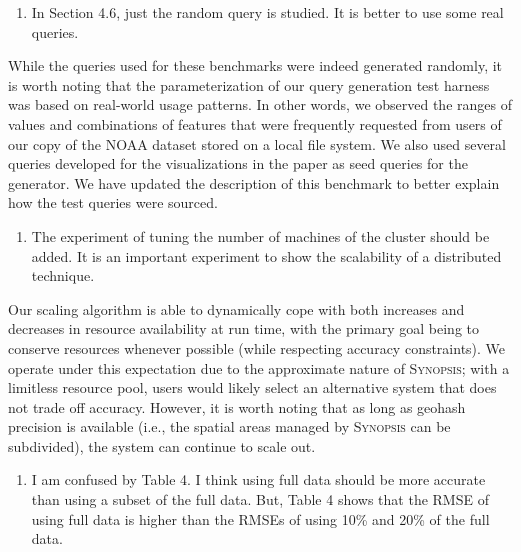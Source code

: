 \documentclass{article}
\begin{document}
\begin{enumerate}
\def\labelenumi{\arabic{enumi})}
\setcounter{enumi}{4}
\item
  In Section 4.6, just the random query is studied. It is better to use
  some real queries.
\end{enumerate}

\begin{tcolorbox}
While the queries used for these benchmarks were indeed generated randomly, it is worth noting that the parameterization of our query generation test harness was based on real-world usage patterns. In other words, we observed the ranges of values and combinations of features that were frequently requested from users of our copy of the NOAA dataset stored on a local file system. We also used several queries developed for the visualizations in the paper as seed queries for the generator. We have updated the description of this benchmark to better explain how the test queries were sourced.
\end{tcolorbox}

\begin{enumerate}
\def\labelenumi{\arabic{enumi})}
\setcounter{enumi}{5}
\item
  The experiment of tuning the number of machines of the cluster should
  be added. It is an important experiment to show the scalability of a
  distributed technique.
\end{enumerate}

\begin{tcolorbox}
    Our scaling algorithm is able to dynamically cope with both increases and decreases in resource availability at run time, with the primary goal being to conserve resources whenever possible (while respecting accuracy constraints). We operate under this expectation due to the approximate nature of \textsc{Synopsis}; with a limitless resource pool, users would likely select an alternative system that does not trade off accuracy. However, it is worth noting that as long as geohash precision is available (i.e., the spatial areas managed by \textsc{Synopsis} can be subdivided), the system can continue to scale out.
\end{tcolorbox}

\begin{enumerate}
\def\labelenumi{\arabic{enumi})}
\setcounter{enumi}{6}
\item
  I am confused by Table 4. I think using full data should be more
  accurate than using a subset of the full data. But, Table 4 shows that
  the RMSE of using full data is higher than the RMSEs of using 10\% and
  20\% of the full data.
\end{enumerate}
\end{document}
